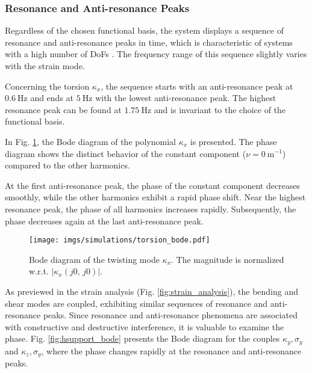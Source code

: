     \subsubsection{Resonance and Anti-resonance Peaks}
    Regardless of the chosen functional basis, the system displays a sequence of resonance and anti-resonance peaks in time, which is characteristic of systems with a high number of \ac{DoFs} \cite{Ewins1999}. The frequency range of this sequence slightly varies with the strain mode.

    Concerning the torsion $\kappa_x$, the sequence starts with an anti-resonance peak at $\SI{0.6}{\hertz}$ and ends at $\SI{5}{\hertz}$ with the lowest anti-resonance peak. The highest resonance peak can be found at $\SI{1.75}{\hertz}$ and is invariant to the choice of the functional basis.

    In Fig. \ref{fig:torsion_bode}, the Bode diagram of the polynomial $\kappa_x$ is presented. The phase diagram shows the distinct behavior of the constant component ($\nu = \SI{0}{\meter^{-1}}$) compared to the other harmonics.

    At the first anti-resonance peak, the phase of the constant component decreases smoothly, while the other harmonics exhibit a rapid phase shift. Near the highest resonance peak, the phase of all harmonics increases rapidly. Subsequently, the phase decreases again at the last anti-resonance peak.
    \begin{figure}
        \centering
        \texttt{[image: imgs/simulations/torsion\_bode.pdf]}
        \caption{Bode diagram of the twisting mode $\kappa_x$. The magnitude is normalized w.r.t. $|\kappa_x(j0, \, j 0)|$.}
        \label{fig:torsion_bode}
    \end{figure}
    
    As previewed in the strain analysis (Fig. \ref{fig:strain_analysis}), the bending and shear modes are coupled, exhibiting similar sequences of resonance and anti-resonance peaks.
    Since resonance and anti-resonance phenomena are associated with constructive and destructive interference, it is valuable to examine the phase.
    Fig. \ref{fig:hsupport_bode} presents the Bode diagram for the couples $\kappa_y, \sigma_y$ and $\kappa_z, \sigma_y$, where the phase changes rapidly at the resonance and anti-resonance peaks.
    

